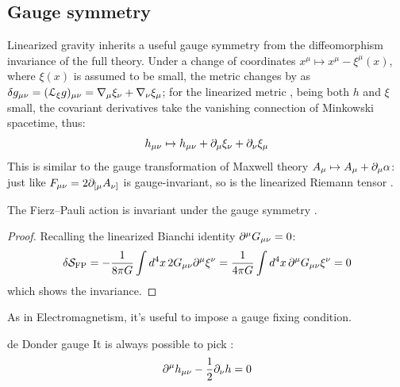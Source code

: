 \subsection{Gauge symmetry}

Linearized gravity inherits a useful gauge symmetry from the diffeomorphism invariance of the full theory. Under a change of coordinates $ x^\mu \mapsto x^\mu - \xi^\mu(x) $, where $ \xi(x) $ is assumed to be small, the metric changes by  as $ \delta g_{\mu \nu} = (\EuScript{L}_\xi g)_{\mu \nu} = \nabla_\mu \xi_\nu + \nabla_\nu \xi_\mu $; for the linearized metric , being both $ h $ and $ \xi $ small, the covariant derivatives take the vanishing connection of Minkowski spacetime, thus:
\begin{equation}
  h_{\mu \nu} \mapsto h_{\mu \nu} + \partial_\mu \xi_\nu + \partial_\nu \xi_\mu
  \label{eq:weak-gauge-tr}
\end{equation}
This is similar to the gauge transformation of Maxwell theory $ A_\mu \mapsto A_\mu + \partial_\mu \alpha $: just like $ F_{\mu \nu} = 2 \partial_{[\mu} A_{\nu]} $ is gauge-invariant, so is the linearized Riemann tensor .

\begin{proposition}{}{}
  The Fierz--Pauli action is invariant under the gauge symmetry .
\end{proposition}

\begin{proofbox}
  \begin{proof}
    Recalling the linearized Bianchi identity $ \partial^\mu G_{\mu \nu} = 0 $:
    \begin{equation*}
      \delta \mathcal{S}_{\text{FP}} = - \frac{1}{8\pi G} \int d^4 x\, 2 G_{\mu \nu} \partial^\mu \xi^\nu = \frac{1}{4\pi G} \int d^4 x\, \partial^\mu G_{\mu \nu} \xi^\nu = 0
    \end{equation*}
    which shows the invariance.
  \end{proof}
\end{proofbox}

As in Electromagnetism, it's useful to impose a gauge fixing condition.

\begin{proposition}{de Donder gauge}{}
  It is always possible to pick :
  \begin{equation}
    \partial^\mu h_{\mu \nu} - \frac{1}{2} \partial_\nu h = 0
  \end{equation}
\end{proposition}

